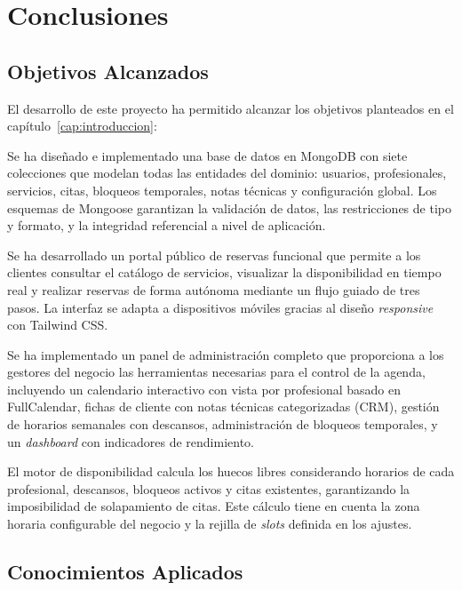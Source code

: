 
\chapter{Conclusiones}\label{cap:conclusiones}

\section{Objetivos Alcanzados}\label{sec:obj-alcanzados}

El desarrollo de este proyecto ha permitido alcanzar los objetivos planteados en el cap\'itulo~\ref{cap:introduccion}:

Se ha dise\~nado e implementado una base de datos en MongoDB con siete colecciones que modelan todas las entidades del dominio: usuarios, profesionales, servicios, citas, bloqueos temporales, notas t\'ecnicas y configuraci\'on global. Los esquemas de Mongoose garantizan la validaci\'on de datos, las restricciones de tipo y formato, y la integridad referencial a nivel de aplicaci\'on.

Se ha desarrollado un portal p\'ublico de reservas funcional que permite a los clientes consultar el cat\'alogo de servicios, visualizar la disponibilidad en tiempo real y realizar reservas de forma aut\'onoma mediante un flujo guiado de tres pasos. La interfaz se adapta a dispositivos m\'oviles gracias al dise\~no \textit{responsive} con Tailwind CSS.

Se ha implementado un panel de administraci\'on completo que proporciona a los gestores del negocio las herramientas necesarias para el control de la agenda, incluyendo un calendario interactivo con vista por profesional basado en FullCalendar, fichas de cliente con notas t\'ecnicas categorizadas (CRM), gesti\'on de horarios semanales con descansos, administraci\'on de bloqueos temporales, y un \textit{dashboard} con indicadores de rendimiento.

El motor de disponibilidad calcula los huecos libres considerando horarios de cada profesional, descansos, bloqueos activos y citas existentes, garantizando la imposibilidad de solapamiento de citas. Este c\'alculo tiene en cuenta la zona horaria configurable del negocio y la rejilla de \textit{slots} definida en los ajustes.

\section{Conocimientos Aplicados}\label{sec:conocimientos}

